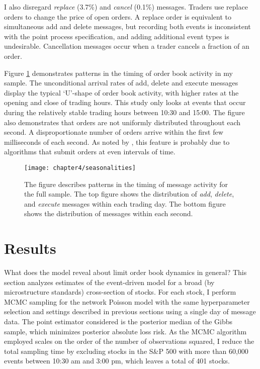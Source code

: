 	I also disregard \textit{replace} (3.7\%) and \textit{cancel} (0.1\%) messages. Traders use replace orders to change the price of open orders. A replace order is equivalent to simultaneous add and delete messages, but recording both events is inconsistent with the point process specification, and adding additional event types is undesirable. Cancellation messages occur when a trader cancels a fraction of an order.

	Figure \ref{fig:seasonalities} demonstrates patterns in the timing of order book activity in my sample. The unconditional arrival rates of add, delete and execute messages display the typical `U'-shape of order book activity, with higher rates at the opening and close of trading hours. This study only looks at events that occur during the relatively stable trading hours between 10:30 and 15:00. The figure also demonstrates that orders are not uniformly distributed throughout each second. A disproportionate number of orders arrive within the first few milliseconds of each second. As noted by \cite{Hasbrouck2013}, this feature is probably due to algorithms that submit orders at even intervals of time.

	\begin{figure}[t]
		\small
		\linespread{1}
		\centering
		\texttt{[image: chapter4/seasonalities]}
		\captionsetup{skip=-20pt, labelsep=colon, font=footnotesize, width=\linewidth, justification=justified}
		\caption[Message activity seasonalities]{The figure describes patterns in the timing of message activity for the full sample. The top figure shows the distribution of \textit{add}, \textit{delete}, and \textit{execute} messages within each trading day. The bottom figure shows the distribution of messages within each second.}
		\label{fig:seasonalities}
	\end{figure}


\section{Results}
	What does the model reveal about limit order book dynamics in general? This section analyzes estimates of the event-driven model for a broad (by microstructure standards) cross-section of stocks. For each stock, I perform MCMC sampling for the network Poisson model with the same hyperparameter selection and settings described in previous sections using a single day of message data. The point estimator considered is the posterior median of the Gibbs sample, which minimizes posterior absolute loss risk. As the MCMC algorithm employed scales on the order of the number of observations squared, I reduce the total sampling time by excluding stocks in the S\&P 500 with more than 60,000 events between 10:30 am and 3:00 pm, which leaves a total of 401 stocks.

